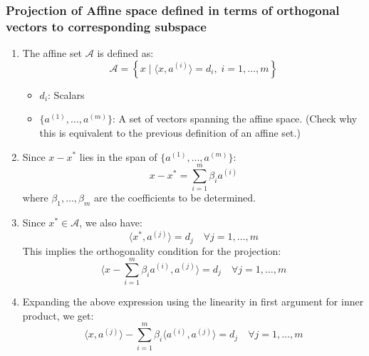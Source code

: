         \subsubsection{Projection of Affine space defined in terms of orthogonal vectors to corresponding subspace}
        \begin{derivation}
            \begin{enumerate}
                \item The affine set $\mathcal{A}$ is defined as:
                \[
                \mathcal{A} = \left\{ x \mid \langle x, a^{(i)} \rangle = d_i, \; i = 1, \dots, m \right\}
                \]
                \begin{itemize}
                    \item $d_i$: Scalars
                    \item $\{a^{(1)}, \dots, a^{(m)}\}$: A set of vectors spanning the affine space. (Check why this is equivalent to the previous definition of an affine set.)
                \end{itemize}

                
                \item Since $x-x^*$ lies in the span of $\{a^{(1)}, \dots, a^{(m)}\}$:
                \[
                x - x^* = \sum_{i=1}^{m} \beta_i a^{(i)}
                \]
                where $\beta_1, \dots, \beta_m$ are the coefficients to be determined.
                
                \item Since $x^* \in \mathcal{A}$, we also have:
                \[
                \langle x^*, a^{(j)} \rangle = d_j \quad \forall j = 1, \dots, m
                \]
                This implies the orthogonality condition for the projection:
                \[
                \langle x - \sum_{i=1}^{m} \beta_i a^{(i)}, a^{(j)} \rangle = d_j \quad \forall j = 1, \dots, m
                \]
            
                \item Expanding the above expression using the linearity in first argument for inner product, we get:
                \[
                \langle x, a^{(j)} \rangle - \sum_{i=1}^{m} \beta_i \langle a^{(i)}, a^{(j)} \rangle = d_j \quad \forall j = 1, \dots, m
                \]
                

\end{enumerate}
\end{derivation}
